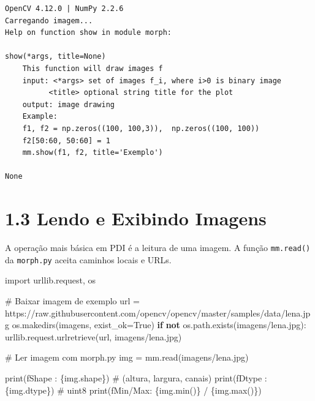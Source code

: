 \documentclass[
  portuguese,
  letterpaper,
  openany,
  oneside,
  12pt,
  a4paper]{book}
\newenvironment{Shaded}{\begin{snugshade}}{\end{snugshade}}
\newcommand{\BuiltInTok}[1]{\textcolor[rgb]{0.00,0.23,0.31}{#1}}
\newcommand{\CommentTok}[1]{\textcolor[rgb]{0.37,0.37,0.37}{#1}}
\newcommand{\ControlFlowTok}[1]{\textcolor[rgb]{0.00,0.23,0.31}{\textbf{#1}}}
\newcommand{\ImportTok}[1]{\textcolor[rgb]{0.00,0.46,0.62}{#1}}
\newcommand{\KeywordTok}[1]{\textcolor[rgb]{0.00,0.23,0.31}{\textbf{#1}}}
\newcommand{\NormalTok}[1]{\textcolor[rgb]{0.00,0.23,0.31}{#1}}
\newcommand{\OperatorTok}[1]{\textcolor[rgb]{0.37,0.37,0.37}{#1}}
\newcommand{\SpecialCharTok}[1]{\textcolor[rgb]{0.37,0.37,0.37}{#1}}
\newcommand{\SpecialStringTok}[1]{\textcolor[rgb]{0.13,0.47,0.30}{#1}}
\newcommand{\StringTok}[1]{\textcolor[rgb]{0.13,0.47,0.30}{#1}}
\newcommand{\VariableTok}[1]{\textcolor[rgb]{0.07,0.07,0.07}{#1}}
\begin{document}
\begin{tcolorbox}
\begin{verbatim}
OpenCV 4.12.0 | NumPy 2.2.6
Carregando imagem...
Help on function show in module morph:

show(*args, title=None)
    This function will draw images f
    input: <*args> set of images f_i, where i>0 is binary image
          <title> optional string title for the plot
    output: image drawing
    Example:
    f1, f2 = np.zeros((100, 100,3)),  np.zeros((100, 100))
    f2[50:60, 50:60] = 1
    mm.show(f1, f2, title='Exemplo')

None
\end{verbatim}

\section{1.3 Lendo e Exibindo Imagens}\label{lendo-e-exibindo-imagens-1}

A operação mais básica em PDI é a leitura de uma imagem. A função
\texttt{mm.read()} da \texttt{morph.py} aceita caminhos locais e URLs.

\begin{Shaded}
\begin{Highlighting}[]
\ImportTok{import}\NormalTok{ urllib.request, os}

\CommentTok{\# Baixar imagem de exemplo}
\NormalTok{url }\OperatorTok{=} \StringTok{\textquotesingle{}https://raw.githubusercontent.com/opencv/opencv/master/samples/data/lena.jpg\textquotesingle{}}
\NormalTok{os.makedirs(}\StringTok{\textquotesingle{}imagens\textquotesingle{}}\NormalTok{, exist\_ok}\OperatorTok{=}\VariableTok{True}\NormalTok{)}
\ControlFlowTok{if} \KeywordTok{not}\NormalTok{ os.path.exists(}\StringTok{\textquotesingle{}imagens/lena.jpg\textquotesingle{}}\NormalTok{):}
\NormalTok{    urllib.request.urlretrieve(url, }\StringTok{\textquotesingle{}imagens/lena.jpg\textquotesingle{}}\NormalTok{)}

\CommentTok{\# Ler imagem com morph.py}
\NormalTok{img }\OperatorTok{=}\NormalTok{ mm.read(}\StringTok{\textquotesingle{}imagens/lena.jpg\textquotesingle{}}\NormalTok{)}

\BuiltInTok{print}\NormalTok{(}\SpecialStringTok{f\textquotesingle{}Shape  : }\SpecialCharTok{\{}\NormalTok{img}\SpecialCharTok{.}\NormalTok{shape}\SpecialCharTok{\}}\SpecialStringTok{\textquotesingle{}}\NormalTok{)    }\CommentTok{\# (altura, largura, canais)}
\BuiltInTok{print}\NormalTok{(}\SpecialStringTok{f\textquotesingle{}Dtype  : }\SpecialCharTok{\{}\NormalTok{img}\SpecialCharTok{.}\NormalTok{dtype}\SpecialCharTok{\}}\SpecialStringTok{\textquotesingle{}}\NormalTok{)    }\CommentTok{\# uint8}
\BuiltInTok{print}\NormalTok{(}\SpecialStringTok{f\textquotesingle{}Min/Max: }\SpecialCharTok{\{}\NormalTok{img}\SpecialCharTok{.}\BuiltInTok{min}\NormalTok{()}\SpecialCharTok{\}}\SpecialStringTok{ / }\SpecialCharTok{\{}\NormalTok{img}\SpecialCharTok{.}\BuiltInTok{max}\NormalTok{()}\SpecialCharTok{\}}\SpecialStringTok{\textquotesingle{}}\NormalTok{)}


\end{Highlighting}
\end{Shaded}
\end{tcolorbox}
\end{document}
